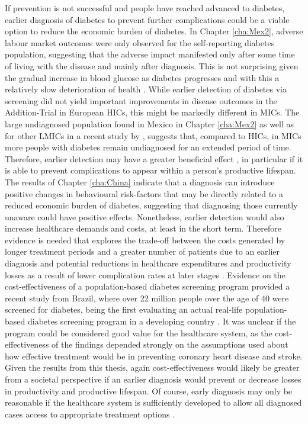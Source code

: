 If prevention is not successful and people have reached advanced to diabetes, earlier diagnosis of diabetes to prevent further complications could be a viable option to reduce the economic burden of diabetes. In Chapter \ref{cha:Mex2}, adverse labour market outcomes were only observed for the self-reporting diabetes population, suggesting that the adverse impact manifested only after some time of living with the disease and mainly after diagnosis. This is not surprising given the gradual increase in blood glucose as diabetes progresses and with this a relatively slow deterioration of health \parencite{Bertram2010}. While earlier detection of diabetes via screening did not yield important improvements in disease outcomes in the Addition-Trial in European \acp{HIC}, this might be markedly different in \acp{MIC}. The large undiagnosed population found in Mexico in Chapter \ref{cha:Mex2} as well as for other \acp{LMIC} in a recent study by \textcite{Beagley2014}, suggests that, compared to \acp{HIC}, in \acp{MIC} more people with diabetes remain undiagnosed for an extended period of time. Therefore, earlier detection may have a greater beneficial effect  \parencite{Choukem2013}, in particular if it is able to prevent complications to appear within a person's productive lifespan. The results of Chapter \ref{cha:China} indicate that a diagnosis can introduce positive changes in behavioural risk-factors that may be directly related to a reduced economic burden of diabetes, suggesting that diagnosing those currently unaware could have positive effects. Nonetheless, earlier detection would also increase healthcare demands and costs, at least in the short term. Therefore evidence is needed that explores the trade-off between the costs generated by longer treatment periods and a greater number of patients due to an earlier diagnosis and potential reductions in healthcare expenditures and productivity losses as a result of lower complication rates at later stages \parencite{Engelgau2012}. Evidence on the cost-effectiveness of a population-based diabetes screening program provided a recent study from Brazil, where over 22 million people over the age of 40 were screened for diabetes, being the first evaluating an actual real-life population-based diabetes screening program in a developing country \parencite{Toscano2015}. It was unclear if the program could be considered good value for the healthcare system, as the cost-effectiveness of the findings depended strongly on the assumptions used about how effective treatment would be in preventing coronary heart disease and stroke. Given the results from this thesis, again cost-effectiveness would likely be greater from a societal perspective if an earlier diagnosis would prevent or decrease losses in productivity and productive lifespan. Of course, early diagnosis may only be reasonable if the healthcare system is sufficiently developed to allow all diagnosed cases access to appropriate treatment options \parencite{Toscano2015,Engelgau2012}. 


